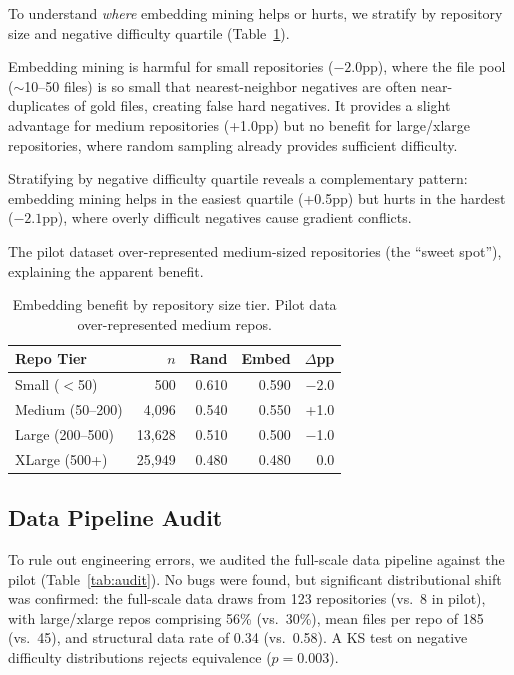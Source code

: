 \documentclass[11pt,a4paper]{article}
\begin{document}
To understand \emph{where} embedding mining helps or hurts, we stratify by repository size and negative difficulty quartile (Table~\ref{tab:stratified}).

Embedding mining is harmful for small repositories ($-2.0$pp), where the file pool (${\sim}$10--50 files) is so small that nearest-neighbor negatives are often near-duplicates of gold files, creating false hard negatives.
It provides a slight advantage for medium repositories (+1.0pp) but no benefit for large/xlarge repositories, where random sampling already provides sufficient difficulty.

Stratifying by negative difficulty quartile reveals a complementary pattern: embedding mining helps in the easiest quartile (+0.5pp) but hurts in the hardest ($-2.1$pp), where overly difficult negatives cause gradient conflicts.

The pilot dataset over-represented medium-sized repositories (the ``sweet spot''), explaining the apparent benefit.

\begin{table}[t]
\centering
\small
\caption{Embedding benefit by repository size tier. Pilot data over-represented medium repos.}
\label{tab:stratified}
\begin{tabular}{lrrrr}
\toprule
Repo Tier & $n$ & Rand & Embed & $\Delta$pp \\
\midrule
Small ($<$50)    & 500   & 0.610 & 0.590 & $-$2.0 \\
Medium (50--200) & 4,096 & 0.540 & 0.550 & +1.0 \\
Large (200--500) & 13,628 & 0.510 & 0.500 & $-$1.0 \\
XLarge (500+)    & 25,949 & 0.480 & 0.480 & 0.0 \\
\bottomrule
\end{tabular}
\end{table}

\subsection{Data Pipeline Audit}
\label{sec:audit}

To rule out engineering errors, we audited the full-scale data pipeline against the pilot (Table~\ref{tab:audit}).
No bugs were found, but significant distributional shift was confirmed:
the full-scale data draws from 123 repositories (vs.\ 8 in pilot), with large/xlarge repos comprising 56\% (vs.\ 30\%), mean files per repo of 185 (vs.\ 45), and structural data rate of 0.34 (vs.\ 0.58).
A KS test on negative difficulty distributions rejects equivalence ($p = 0.003$).
\end{document}
